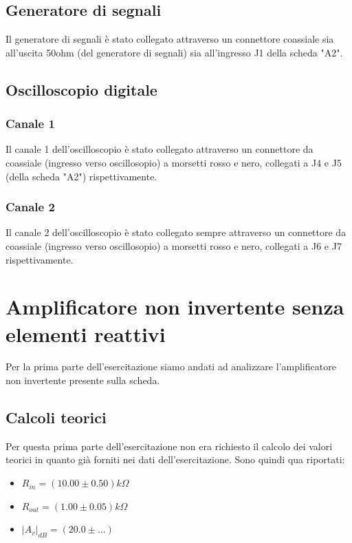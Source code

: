 \documentclass{article}
\begin{document}
\subsection{Generatore di segnali}
Il generatore di segnali è stato collegato attraverso un connettore coassiale sia all'uscita 50ohm (del generatore di segnali) sia all'ingresso J1 della scheda "A2".

\subsection{Oscilloscopio digitale}
\subsubsection{Canale 1} Il canale 1 dell'oscilloscopio è stato collegato attraverso un connettore da coassiale (ingresso verso oscillosopio) a morsetti rosso e nero, collegati a J4 e J5 (della scheda "A2") rispettivamente.
\subsubsection{Canale 2} Il canale 2 dell'oscilloscopio è stato collegato sempre attraverso un connettore da coassiale (ingresso verso oscillosopio) a morsetti rosso e nero, collegati a J6 e J7 rispettivamente.

\section{Amplificatore non invertente senza elementi reattivi}
Per la prima parte dell'esercitazione siamo andati ad analizzare l'amplificatore non invertente presente sulla scheda.

\subsection{Calcoli teorici}
Per questa prima parte dell'esercitazione non era richiesto il calcolo dei valori teorici in quanto già forniti nei dati dell'esercitazione.
Sono quindi qua riportati:
\begin{itemize}
\item \large $R_{in} = (10.00 \pm 0.50)k\Omega$
\item \large $R_{out} = (1.00 \pm 0.05)k\Omega$
\item \large ${|A_{v}|}_{dB} = (20.0 \pm ...)$
\end{itemize}
\end{document}
